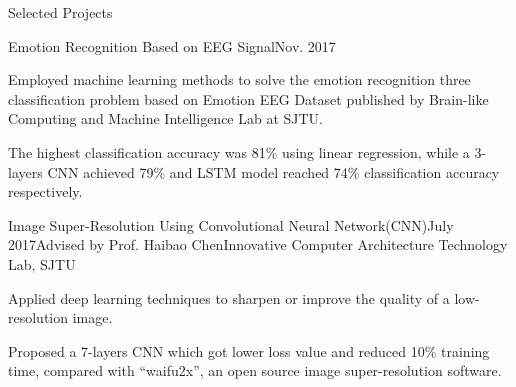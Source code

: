 \documentclass{resume_ucla} %
\begin{document}
\begin{rSection}{Selected Projects}
\begin{rSubsection}{Emotion Recognition Based on EEG Signal}{Nov. 2017}{}{}
\item Employed machine learning methods to solve the emotion recognition three classification problem based on Emotion EEG Dataset published by Brain-like Computing and Machine Intelligence Lab at SJTU.
\item The highest classification accuracy was 81\% using linear regression, while a 3-layers CNN achieved 79\% and LSTM model reached 74\% classification accuracy respectively.
\end{rSubsection}

\begin{comment}
\begin{rSubsection}{Implementation of Unate Recursive Complement Algorithm}{Aug. 2017}{Advised by Prof. Weikang Qian}{Emerging Computing Technology Laboratory, SJTU}
\item Developed a program that performs the unate recursive complement using the Unate Recursive Paradigm idea.
\item Given an input file representing a Boolean function F as a Positional Cube Notation (PCN) cube list, this program will complement it and return the result as a PCN cube list.
\end{rSubsection}
\end{comment}

\begin{comment}
\begin{rSubsection}{Reading Combinational Circuit and Evaluating Its Outputs}{July 2017}{Advised by Prof. Weikang Qian}{Emerging Computing Technology Laboratory, SJTU}
\item Designed a software tool which can read "bench" format file describing a combinational circuit and implemented a topological sorting algorithm to calculate the values for all the primary outputs of the circuits.
\end{rSubsection}
\end{comment}

\begin{rSubsection}{Image Super-Resolution Using Convolutional Neural Network(CNN)}{July 2017}{Advised by Prof. Haibao Chen}{Innovative Computer Architecture Technology Lab, SJTU}
\item Applied deep learning techniques to sharpen or improve the quality of a low-resolution image.
\item Proposed a 7-layers CNN which got lower loss value and reduced 10\% training time, compared with ``waifu2x'', an open source image super-resolution software.
\end{rSubsection}


\end{rSection}
\end{document}
